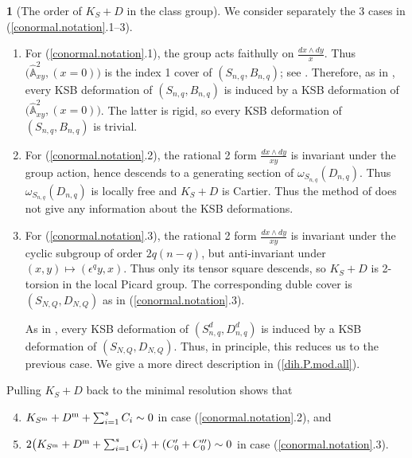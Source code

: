 \documentclass{amsart}
\theoremstyle{definition}
\newtheorem{say}[thm]{}
\theoremstyle{remark}
\renewcommand{\a}[0]{\hat{\mathbb A}}
\begin{document}
\begin{say}[The order of $K_S+D$ in the class group]\label{ord.of.K+C.say}
  We consider separately the  3
  cases in  (\ref{conormal.notation}.1--3).
\begin{enumerate}
\item  For (\ref{conormal.notation}.1), the group acts faithully on 
$\frac{dx\wedge dy}{x}$. Thus  $(\a^2_{xy}, (x=0)\bigr)$ is the index 1 cover of $(S_{n,q}, B_{n,q})$; see \cite[2.49]{kk-singbook}. Therefore, as in \cite[2.23]{k-modbook},
every KSB deformation of $(S_{n,q}, B_{n,q})$ is induced by a KSB deformation of  $(\a^2_{xy}, (x=0)\bigr)$. The latter is rigid, so every
KSB deformation of $(S_{n,q}, B_{n,q})$ is trivial.
\item  For (\ref{conormal.notation}.2),
  the rational 2 form
  $\frac{dx\wedge dy}{xy}$ is invariant under the group action, hence descends to a generating section of  $\omega_{S_{n,q}}(D_{n,q})$.  Thus
  $\omega_{S_{n,q}}(D_{n,q})$ is locally free and $K_S+D$ is Cartier.
  Thus the method of \cite[2.23]{k-modbook} does not give any information about the  KSB deformations.

  
  
  
\item  For (\ref{conormal.notation}.3),  the rational 2 form
  $\frac{dx\wedge dy}{xy}$ is invariant under the cyclic subgroup of order $2q(n-q)$, but anti-invariant under  $(x, y)\mapsto (\epsilon^q y, x)$. Thus only its tensor square descends, so
  $K_S+D$ is 2-torsion in the local Picard group.
  The corresponding duble cover is $(S_{N,Q}, D_{N,Q})$ as in (\ref{conormal.notation}.3).

  As in \cite[2.23]{k-modbook},
  every KSB deformation of $(S^d_{n,q}, D^d_{n,q})$ is induced by a KSB deformation of  $(S_{N,Q}, D_{N,Q})$. Thus, in principle, this reduces us to the previous case. We give a more direct description  in (\ref{dih.P.mod.all}).
 
\end{enumerate}

Pulling $K_S+D$ back to the minimal resolution shows that
\begin{enumerate}\setcounter{enumi}{3}
 \item  $K_{S^{\rm m}}+D^{\rm m}+\sum_{i=1}^s C_i\sim 0$ in case (\ref{conormal.notation}.2), and
\item   $2\bigl(K_{S^{\rm m}}+D^{\rm m}+\sum_{i=1}^s C_i\bigr)+(C'_0+C''_0) \sim 0$  in case (\ref{conormal.notation}.3).  
\end{enumerate}
\end{say}
\end{document}

